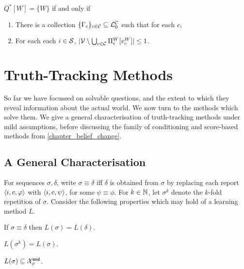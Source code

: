 \begin{corollary}
    \label{tt_cor_qstar_unique_world}
    $Q^*[W] = \{W\}$ if and only if
    \begin{enumerate}
        \item There is a collection $\{\Gamma_c\}_{c \in \mathcal{C}} \subseteq
              \mathcal{L}_0^{\mathcal{C}}$ such that for each $c$,
        \item For each each $i \in \mathcal{S}$, $|\mathcal{V} \setminus \bigcup_{c \in
            \mathcal{C}}{\Pi^W_i[v^W_c]}| \le 1$.
    \end{enumerate}
\end{corollary}

\section{Truth-Tracking Methods}
\label{tt_sec_methods}

So far we have focussed on solvable questions, and the extent to which they
reveal information about the actual world. We now turn to the methods which
solve them. We give a general characterisation of truth-tracking methods under
mild assumptions, before discussing the family of conditioning and score-based
methods from \cref{chapter_belief_change}.

\subsection{A General Characterisation}

For sequences $\sigma, \delta$, write $\sigma \equiv \delta$ iff $\delta$ is
obtained from $\sigma$ by replacing each report $\langle {i, c, \varphi} \rangle$ with
$\langle {i, c, \psi} \rangle$, for some $\psi \equiv \phi$. For $k \in \mathbb{N}$, let
$\sigma^k$ denote the $k$-fold repetition of $\sigma$.
%
Consider the following properties which may hold of a learning method $L$.

\begin{axiomlist}
\begin{axiom}[\equivalence{}]
    If $\sigma \equiv \delta$ then $L(\sigma) = L(\delta)$.
\end{axiom}
\begin{axiom}[\repetition{}]
    $L(\sigma^k) = L(\sigma)$.
\end{axiom}
\begin{axiom}[\soundness{}]
    $L(\sigma) \subseteq \mathcal{X}^{\mathsf{snd}}_\sigma$.
\end{axiom}
\end{axiomlist}

